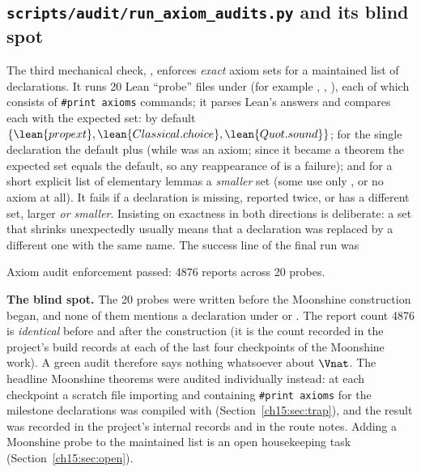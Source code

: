 \subsection{\texorpdfstring{\texttt{scripts/audit/run\_axiom\_audits.py}}{The axiom audit} and its blind spot}\label{ch15:sec:audit}

The third mechanical check, , enforces \emph{exact} axiom
sets for a maintained list of declarations. It runs 20 Lean ``probe'' files under
 (for example ,
, ), each of which consists of
\texttt{\#print axioms} commands; it parses Lean's answers and compares each with the expected set:
by default $\{\lean{propext},\lean{Classical.choice},\lean{Quot.sound}\}$; for the single
declaration  the default plus  (while
 was an axiom; since it became a theorem the expected set  equals the default,
so any reappearance of  is a failure); and for
a short explicit list of elementary lemmas a \emph{smaller} set (some use only , or
no axiom at all). It fails if a declaration is missing, reported twice, or has a different set,
larger \emph{or smaller}. Insisting on exactness in both directions is deliberate: a set that
shrinks unexpectedly usually means that a declaration was replaced by a different one with the same
name. The success line of the final run was
\begin{plaincode}
Axiom audit enforcement passed: 4876 reports across 20 probes.
\end{plaincode}

\begin{warning}
\textbf{The blind spot.} The 20 probes were written before the Moonshine construction began, and
none of them mentions a declaration under  or . The
report count 4876 is \emph{identical} before and after the construction (it is the count recorded
in the project's build records at each of the last four checkpoints of the Moonshine work). A green audit therefore says nothing
whatsoever about $\Vnat$. The headline Moonshine theorems were audited individually instead: at each
checkpoint a scratch file importing  and containing \texttt{\#print axioms} for the
milestone declarations was compiled with 
(Section~\ref{ch15:sec:trap}), and the result was recorded in the project's internal records and in the route
notes. Adding a Moonshine probe to the maintained list is an open housekeeping task
(Section~\ref{ch15:sec:open}).
\end{warning}

